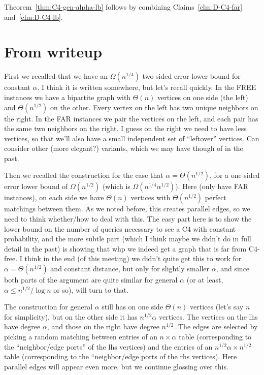 \bigskip
Theorem~\ref{thm:C4-gen-alpha-lb} follows by combining Claims~\ref{clm:D-C4-far} and~\ref{clm:D-C4-lb}.

\iffalse
\newpage
\section{From writeup}



First we recalled that we have an $\Omega(n^{1/4})$ two-sided error lower bound for constant $\alpha$. I think it is written somewhere, but let's recall quickly. In the FREE instances we have a bipartite graph with $\Theta(n)$ vertices on one side (the left) and $\Theta(n^{1/2})$ on the other. Every vertex on the left has two unique neighbors on the right. In the FAR instances we pair the vertices on the left, and each pair has the same two neighbors on the right. I guess on the right we need to have less vertices, so that we'll also have a small independent set of ``leftover'' vertices. Can consider other (more elegant?) variants, which we may have though of in the past.

Then we recalled the construction for the case that $\alpha = \Theta(n^{1/2})$, for a one-sided error lower bound of $\Omega(n^{1/2})$ (which is $\Omega(n^{1/4} \alpha^{1/2})$). Here (only have FAR instances), on each side we have $\Theta(n)$ vertices with $\Theta(n^{1/2})$ perfect matchings between them. As we noted before, this creates parallel edges, so we need to think whether/how to deal with this. The easy part here is to show the lower bound on the number of queries necessary to see a C4  with constant probability, and the more subtle part (which I think maybe we didn't do in full detail in the past) is showing that whp we indeed get a graph that is far from C4-free. I think in the end (of this meeting) we didn't quite get this to work for $\alpha = \Theta(n^{1/2})$ and constant distance, but only for slightly smaller $\alpha$, and since  both parts of the argument are quite similar for general $\alpha$ (or at least, $\alpha \leq n^{1/2}/\log n$ or so), will turn to that.

The construction for general $\alpha$ still has on one side $\Theta(n)$ vertices (let's say $n$ for simplicity), but on the other side it has $n^{1/2}\alpha$ vertices. The vertices on the lhs have degree $\alpha$, and those on the right have degree $n^{1/2}$.
The edges are selected by picking a random matching between entries of an $n\times \alpha$ table (corresponding to the ``neighbor/edge ports'' of the lhs vertices) and the entries of an $n^{1/2}\alpha \times n^{1/2}$ table (corresponding to the ``neighbor/edge ports of the rhs vertices). Here parallel edges will appear even more, but we continue glossing over this.

